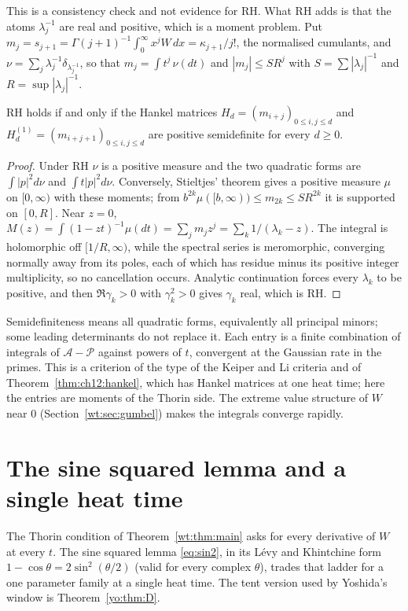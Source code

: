 This is a consistency check and not evidence for RH. What RH adds is that the atoms $\lambda_j^{-1}$ are real and positive, which is a moment problem. Put $m_j=s_{j+1}=\Gamma(j+1)^{-1}\int_0^\infty x^jW\,dx=\kappa_{j+1}/j!$, the normalised cumulants, and $\nu=\sum_j\lambda_j^{-1}\delta_{\lambda_j^{-1}}$, so that $m_j=\int t^j\,\nu(dt)$ and $|m_j|\le SR^j$ with $S=\sum|\lambda_j|^{-1}$ and $R=\sup|\lambda_j|^{-1}$.

\begin{proposition}\label{wt:prop:hankel}
RH holds if and only if the Hankel matrices $H_d=(m_{i+j})_{0\le i,j\le d}$ and $H_d^{(1)}=(m_{i+j+1})_{0\le i,j\le d}$ are positive semidefinite for every $d\ge0$.
\end{proposition}

\begin{proof}
Under RH $\nu$ is a positive measure and the two quadratic forms are $\int|p|^2d\nu$ and $\int t|p|^2d\nu$. Conversely, Stieltjes' theorem gives a positive measure $\mu$ on $[0,\infty)$ with these moments; from $b^{2k}\mu([b,\infty))\le m_{2k}\le SR^{2k}$ it is supported on $[0,R]$. Near $z=0$, $M(z)=\int(1-zt)^{-1}\mu(dt)=\sum_jm_jz^j=\sum_k1/(\lambda_k-z)$. The integral is holomorphic off $[1/R,\infty)$, while the spectral series is meromorphic, converging normally away from its poles, each of which has residue minus its positive integer multiplicity, so no cancellation occurs. Analytic continuation forces every $\lambda_k$ to be positive, and then $\Re\gamma_k>0$ with $\gamma_k^2>0$ gives $\gamma_k$ real, which is RH.
\end{proof}

Semidefiniteness means all quadratic forms, equivalently all principal minors; some leading determinants do not replace it. Each entry is a finite combination of integrals of $\mathcal A-\mathcal P$ against powers of $t$, convergent at the Gaussian rate in the primes. This is a criterion of the type of the Keiper and Li criteria and of Theorem~\ref{thm:ch12:hankel}, which has Hankel matrices at one heat time; here the entries are moments of the Thorin side. The extreme value structure of $W$ near $0$ (Section~\ref{wt:sec:gumbel}) makes the integrals converge rapidly.

\section{The sine squared lemma and a single heat time}\label{wt:sec:sin2}

The Thorin condition of Theorem~\ref{wt:thm:main} asks for every derivative of $W$ at every $t$. The sine squared lemma \eqref{eq:sin2}, in its L\'evy and Khintchine form $1-\cos\theta=2\sin^2(\theta/2)$ (valid for every complex $\theta$), trades that ladder for a one parameter family at a single heat time. The tent version used by Yoshida's window is Theorem~\ref{yo:thm:D}.

